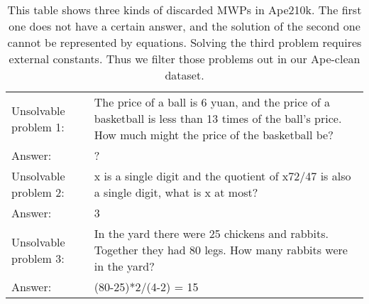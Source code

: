 \documentclass[11pt]{article}
\begin{document}
\begin{table}
\renewcommand\arraystretch{1.05}
\centering
\begin{tabular}{|p{1.8cm}<{\centering}|p{5cm}|}
\hline
Unsolvable problem 1: & The price of a ball is 6 yuan, and the price of a basketball is less than 13 times of the ball's price. How much might the price of the basketball be? \\ 
Answer:       &  ?    \\
\hline
Unsolvable problem 2: & x is a single digit and the quotient of x72/47 is also a single digit, what is x at most? \\ 
Answer:       &  3    \\ 
\hline
Unsolvable problem 3: & In the yard there were 25 chickens and rabbits. Together they had 80 legs. How many rabbits were in the yard? \\ 
Answer:       &  (80-25)*2/(4-2) = 15    \\
\hline
\end{tabular}
\caption{This table shows three kinds of discarded MWPs in Ape210k. The first one does not have a certain answer, and the solution of the second one cannot be represented by equations. Solving the third problem requires external constants. Thus we filter those problems out in our Ape-clean dataset.}
\label{tab:data_demo}
\end{table} 
\end{document}
